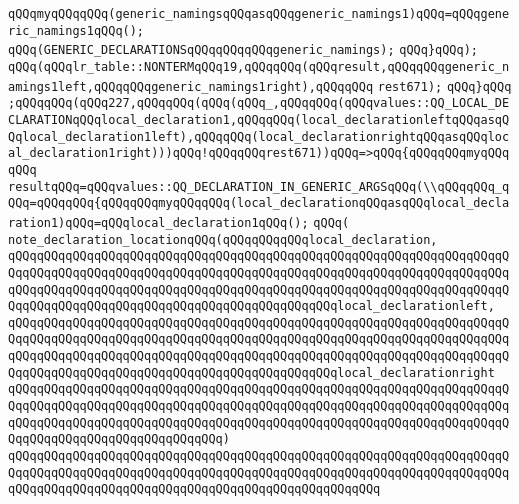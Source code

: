 \verb|qQQqmyqQQqqQQq(generic_namingsqQQqasqQQqgeneric_namings1)qQQq=qQQqgeneric_namings1qQQq();|\newline
\verb|qQQq(GENERIC_DECLARATIONSqQQqqQQqqQQqgeneric_namings);|\newline
\verb|qQQq}qQQq);|\newline
\verb|qQQq(qQQqlr_table::NONTERMqQQq19,qQQqqQQq(qQQqresult,qQQqqQQqgeneric_namings1left,qQQqqQQqgeneric_namings1right),qQQqqQQq|\newline
\verb|rest671);|\newline
\verb|qQQq}qQQq|\newline
\verb|;qQQqqQQq(qQQq227,qQQqqQQq(qQQq(qQQq_,qQQqqQQq(qQQqvalues::QQ_LOCAL_DECLARATIONqQQqlocal_declaration1,qQQqqQQq(local_declarationleftqQQqasqQQqlocal_declaration1left),qQQqqQQq(local_declarationrightqQQqasqQQqlocal_declaration1right)))qQQq!qQQqqQQqrest671))qQQq=>qQQq{qQQqqQQqmyqQQqqQQq|\newline
\verb|resultqQQq=qQQqvalues::QQ_DECLARATION_IN_GENERIC_ARGSqQQq(\\qQQqqQQq_qQQq=qQQqqQQq{qQQqqQQqmyqQQqqQQq(local_declarationqQQqasqQQqlocal_declaration1)qQQq=qQQqlocal_declaration1qQQq();|\newline
\verb|qQQq(|\newline
\verb|note_declaration_locationqQQq(qQQqqQQqqQQqlocal_declaration,|\newline
\verb|qQQqqQQqqQQqqQQqqQQqqQQqqQQqqQQqqQQqqQQqqQQqqQQqqQQqqQQqqQQqqQQqqQQqqQQqqQQqqQQqqQQqqQQqqQQqqQQqqQQqqQQqqQQqqQQqqQQqqQQqqQQqqQQqqQQqqQQqqQQqqQQqqQQqqQQqqQQqqQQqqQQqqQQqqQQqqQQqqQQqqQQqqQQqqQQqqQQqqQQqqQQqqQQqqQQqqQQqqQQqqQQqqQQqqQQqqQQqqQQqqQQqqQQqqQQqqQQqlocal_declarationleft,|\newline
\verb|qQQqqQQqqQQqqQQqqQQqqQQqqQQqqQQqqQQqqQQqqQQqqQQqqQQqqQQqqQQqqQQqqQQqqQQqqQQqqQQqqQQqqQQqqQQqqQQqqQQqqQQqqQQqqQQqqQQqqQQqqQQqqQQqqQQqqQQqqQQqqQQqqQQqqQQqqQQqqQQqqQQqqQQqqQQqqQQqqQQqqQQqqQQqqQQqqQQqqQQqqQQqqQQqqQQqqQQqqQQqqQQqqQQqqQQqqQQqqQQqqQQqqQQqqQQqqQQqlocal_declarationright|\newline
\verb|qQQqqQQqqQQqqQQqqQQqqQQqqQQqqQQqqQQqqQQqqQQqqQQqqQQqqQQqqQQqqQQqqQQqqQQqqQQqqQQqqQQqqQQqqQQqqQQqqQQqqQQqqQQqqQQqqQQqqQQqqQQqqQQqqQQqqQQqqQQqqQQqqQQqqQQqqQQqqQQqqQQqqQQqqQQqqQQqqQQqqQQqqQQqqQQqqQQqqQQqqQQqqQQqqQQqqQQqqQQqqQQqqQQqqQQqqQQqqQQq)|\newline
\verb|qQQqqQQqqQQqqQQqqQQqqQQqqQQqqQQqqQQqqQQqqQQqqQQqqQQqqQQqqQQqqQQqqQQqqQQqqQQqqQQqqQQqqQQqqQQqqQQqqQQqqQQqqQQqqQQqqQQqqQQqqQQqqQQqqQQqqQQqqQQqqQQqqQQqqQQqqQQqqQQqqQQqqQQqqQQqqQQqqQQqqQQqqQQqqQQq|\newline
